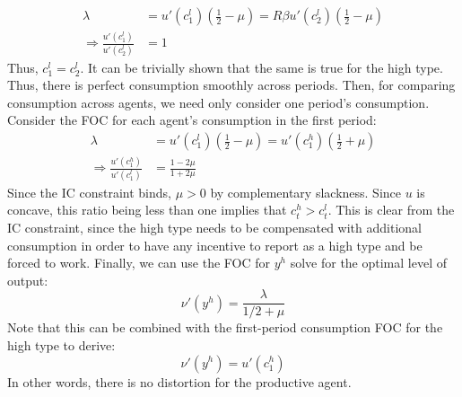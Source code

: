 \documentclass{article}
\begin{document}
\begin{enumerate}
		\begin{align*}
			\lambda 	&= u'(c_1^l)\left(\frac{1}{2} - \mu\right) = R\beta u'(c_2^l)\left(\frac{1}{2} - \mu\right)	\\
			\Rightarrow \frac{u'(c_1^l)}{u'(c_2^l)} &= 1
		\end{align*}
		Thus, ${c_1^l=c_2^l}$. It can be trivially shown that the same is true for the high type. Thus, there is perfect consumption smoothly across periods. Then, for comparing consumption across agents, we need only consider one period's consumption. Consider the FOC for each agent's consumption in the first period:
		\begin{align*}
			\lambda 	&= u'(c_1^l)\left(\frac{1}{2} - \mu\right) = u'(c_1^h)\left(\frac{1}{2} + \mu\right)	\\
			\Rightarrow \frac{u'(c_1^h)}{u'(c_1^l)} &= \frac{1 - 2\mu}{1 + 2\mu}
		\end{align*}
		Since the IC constraint binds, ${\mu>0}$ by complementary slackness. Since $u$ is concave, this ratio being less than one implies that ${c^h_t>c^l_t}$. This is clear from the IC constraint, since the high type needs to be compensated with additional consumption in order to have any incentive to report as a high type and be forced to work. Finally, we can use the FOC for $y^h$ solve for the optimal level of output:
		\[
			\nu'(y^h) = \frac{\lambda}{1/2 + \mu}
		\]
		Note that this can be combined with the first-period consumption FOC for the high type to derive:
		\[
			\nu'(y^h) = u'(c_1^h)
		\]
		In other words, there is no distortion for the productive agent.
		

\end{enumerate}
\end{document}
